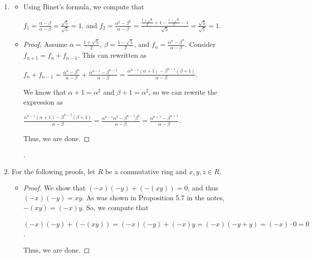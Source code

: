 \documentclass[12pt]{article}
\begin{document}
\begin{enumerate}[start = 1, label = {\bfseries Question \arabic*:}, leftmargin=1in]
       \item \begin{itemize}
        \item[(a)] Using Binet's formula, we compute that \begin{center}
            $f_1 = \frac{\alpha - \beta}{\alpha - \beta} = \frac{\sqrt{5}}{\sqrt{5}}=1$, and $f_2 = \frac{\alpha^2-\beta^2}{\alpha -\beta}=\frac{\frac{1+\sqrt{5}}{2}+1-\frac{1-\sqrt{5}}{2}-1}{\sqrt{5}}=\frac{\sqrt{5}}{\sqrt{5}}=1$.
        \end{center}
        \item[(c)] \begin{proof} Assume $\alpha = \frac{1+\sqrt{5}}{2}$, $\beta = \frac{1-\sqrt{5}}{2}$, and $f_n = \frac{\alpha^n-\beta^n}{\alpha -\beta}$. Consider $f_{n+1} = f_n + f_{n-1}$. This can rewritten as \begin{center}
            $f_n+f_{n-1}=\frac{\alpha^n -\beta^n}{\alpha - \beta}+\frac{\alpha^{n-1} -\beta^{n-1}}{\alpha - \beta} = \frac{\alpha^{n-1}(\alpha + 1) -\beta^{n-1}(\beta +1)}{\alpha - \beta}$.
        \end{center} We know that $\alpha + 1 = \alpha^2$ and $\beta + 1=\alpha^2$, so we can rewrite the expression as \begin{center}
            $\frac{\alpha^{n-1}(\alpha + 1) -\beta^{n-1}(\beta +1)}{\alpha - \beta} = \frac{\alpha^{n-1}\alpha^2 -\beta^{n-1}\beta^2}{\alpha - \beta} = \frac{\alpha^{n+1} -\beta^{n+1}}{\alpha - \beta}$.
        \end{center} Thus, we are done.
    \end{proof}
.       \end{itemize}
       \item For the following proofs, let $R$ be a commutative ring and $x,y,z\in R$.\begin{itemize}
        \item[(a)] \begin{proof} We show that $(-x)(-y) + (-(xy)) = 0$, and thus $(-x)(-y)=xy$. As was shown in Proposition 5.7 in the notes, $-(xy) = (-x)y$. So, we compute that \begin{center}
            $(-x)(-y) + (-(xy)) = (-x)(-y) + (-x)y = (-x)(-y+y)=(-x)\cdot 0 = 0$.
        \end{center} Thus, we are done. \end{proof}


\end{itemize}
\end{enumerate}
\end{document}
